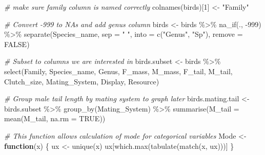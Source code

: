 \documentclass[
  12pt,
]{article}
\newenvironment{Shaded}{\begin{snugshade}}{\end{snugshade}}
\newcommand{\AttributeTok}[1]{\textcolor[rgb]{0.77,0.63,0.00}{#1}}
\newcommand{\CommentTok}[1]{\textcolor[rgb]{0.56,0.35,0.01}{\textit{#1}}}
\newcommand{\ConstantTok}[1]{\textcolor[rgb]{0.00,0.00,0.00}{#1}}
\newcommand{\ControlFlowTok}[1]{\textcolor[rgb]{0.13,0.29,0.53}{\textbf{#1}}}
\newcommand{\DecValTok}[1]{\textcolor[rgb]{0.00,0.00,0.81}{#1}}
\newcommand{\FunctionTok}[1]{\textcolor[rgb]{0.00,0.00,0.00}{#1}}
\newcommand{\NormalTok}[1]{#1}
\newcommand{\OtherTok}[1]{\textcolor[rgb]{0.56,0.35,0.01}{#1}}
\newcommand{\SpecialCharTok}[1]{\textcolor[rgb]{0.00,0.00,0.00}{#1}}
\newcommand{\StringTok}[1]{\textcolor[rgb]{0.31,0.60,0.02}{#1}}
\begin{document}
\begin{Shaded}
\begin{Highlighting}[]
\CommentTok{\# make sure family column is named correctly}
\FunctionTok{colnames}\NormalTok{(birds)[}\DecValTok{1}\NormalTok{] }\OtherTok{\textless{}{-}} \StringTok{"Family"}

\CommentTok{\# Convert {-}999 to NAs and add genus column}
\NormalTok{birds }\OtherTok{\textless{}{-}}\NormalTok{ birds }\SpecialCharTok{\%\textgreater{}\%}
  \FunctionTok{na\_if}\NormalTok{(., }\SpecialCharTok{{-}}\DecValTok{999}\NormalTok{) }\SpecialCharTok{\%\textgreater{}\%}
  \FunctionTok{separate}\NormalTok{(Species\_name, }
           \AttributeTok{sep =} \StringTok{" "}\NormalTok{, }
           \AttributeTok{into =} \FunctionTok{c}\NormalTok{(}\StringTok{"Genus"}\NormalTok{, }\StringTok{"Sp"}\NormalTok{), }
           \AttributeTok{remove =} \ConstantTok{FALSE}\NormalTok{)}

\CommentTok{\# Subset to columns we are interested in}
\NormalTok{birds.subset }\OtherTok{\textless{}{-}}\NormalTok{ birds }\SpecialCharTok{\%\textgreater{}\%}
  \FunctionTok{select}\NormalTok{(Family, Species\_name, Genus, F\_mass, M\_mass, }
\NormalTok{         F\_tail, M\_tail, Clutch\_size, Mating\_System, }
\NormalTok{         Display, Resource)}

\CommentTok{\# Group male tail length by mating system to graph later}
\NormalTok{birds.mating.tail }\OtherTok{\textless{}{-}}\NormalTok{ birds.subset }\SpecialCharTok{\%\textgreater{}\%}
  \FunctionTok{group\_by}\NormalTok{(Mating\_System) }\SpecialCharTok{\%\textgreater{}\%}
  \FunctionTok{summarise}\NormalTok{(}\AttributeTok{M\_tail =} \FunctionTok{mean}\NormalTok{(M\_tail, }\AttributeTok{na.rm =} \ConstantTok{TRUE}\NormalTok{))}

\CommentTok{\# This function allows calculation of mode for categorical variables}
\NormalTok{Mode }\OtherTok{\textless{}{-}} \ControlFlowTok{function}\NormalTok{(x) \{}
\NormalTok{  ux }\OtherTok{\textless{}{-}} \FunctionTok{unique}\NormalTok{(x) }
\NormalTok{  ux[}\FunctionTok{which.max}\NormalTok{(}\FunctionTok{tabulate}\NormalTok{(}\FunctionTok{match}\NormalTok{(x, ux)))]}
\NormalTok{\}}


\end{Highlighting}
\end{Shaded}
\end{document}
